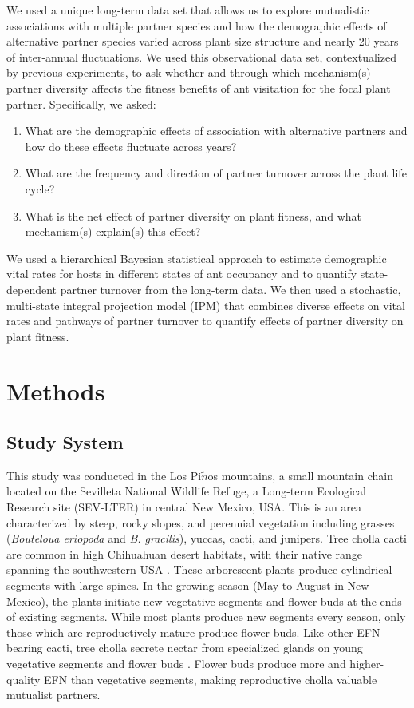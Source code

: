 \documentclass[11pt]{article}
\begin{document}
We used a unique long-term data set that allows us to explore mutualistic associations with multiple partner species and how the demographic effects of alternative partner species varied across plant size structure and nearly 20 years of inter-annual fluctuations. 
We used this observational data set, contextualized by previous experiments, to ask whether and through which mechanism(s) partner diversity affects the fitness benefits of ant visitation for the focal plant partner. 
Specifically, we asked:
	\begin{enumerate}	
		\item{What are the demographic effects of association with alternative partners and how do these effects fluctuate across years?}
		\item{What are the frequency and direction of partner turnover across the plant life cycle?}	
		\item{What is the net effect of partner diversity on plant fitness, and what mechanism(s) explain(s) this effect?}
	\end{enumerate}
We used a hierarchical Bayesian statistical approach to estimate demographic vital rates for hosts in different states of ant occupancy and to quantify state-dependent partner turnover from the long-term data. 
We then used a stochastic, multi-state integral projection model (IPM) that combines diverse effects on vital rates and pathways of partner turnover to quantify effects of partner diversity on plant fitness. 


\section*{Methods}
\subsection*{Study System}
  
This study was conducted in the Los Pi$\tilde{n}$os mountains, a small mountain chain located on the Sevilleta National Wildlife Refuge, a Long-term Ecological Research site (SEV-LTER) in central New Mexico, USA.
This is an area characterized by steep, rocky slopes, and perennial vegetation including grasses (\textit{Bouteloua eriopoda} and \textit{B. gracilis}), yuccas, cacti, and junipers. 
Tree cholla cacti are common in high Chihuahuan desert habitats, with their native range spanning the southwestern USA \citep{Benson1982}. 
These arborescent plants produce cylindrical segments with large spines. 
In the growing season (May to August in New Mexico), the plants initiate new vegetative segments and flower buds at the ends of existing segments. 
While most plants produce new segments every season, only those which are reproductively mature produce flower buds. 
Like other EFN-bearing cacti, tree cholla secrete nectar from specialized glands on young vegetative segments and flower buds \citep{Ness2006,Oliveira1999}. 
Flower buds produce more and higher-quality EFN than vegetative segments, making reproductive cholla valuable mutualist partners. 
\end{document}
